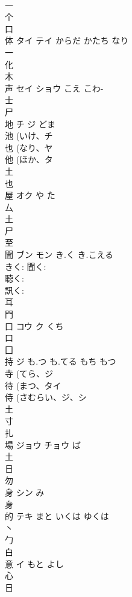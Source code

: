 \documentclass[8pt]{extreport}
\begin{document}
\begin{CJK}{UTF8}{min}
\\	一 
\\	个 
\\	口 
\\	体	タイ テイ	からだ かたち なり	
\\	一 
\\	化 
\\	木 
\\	声	セイ ショウ	こえ こわ-	
\\	士 
\\	尸 
\\	地	チ ジ	どま	
\\	池 (いけ、チ 
\\	也 (なり、ヤ 
\\	他 (ほか、タ 
\\	土 
\\	也 
\\	屋	オク	や た	
\\	厶 
\\	土 
\\	尸 
\\	至 
\\	聞	ブン モン	き.く き.こえる	
\\	きく: 聞く: 
\\	聴く: 
\\	訊く: 
\\	耳 
\\	門 
\\	口	コウ ク	くち	
\\	口 
\\	囗 
\\	持	ジ	も.つ も.てる もち もつ	
\\	寺 (てら、ジ 
\\	待 (まつ、タイ 
\\	侍 (さむらい、ジ、シ 
\\	土 
\\	寸 
\\	扎	
\\	場	ジョウ チョウ	ば	
\\	土 
\\	日 
\\	勿 
\\	身	シン	み	
\\	身 
\\	的	テキ	まと いくは ゆくは	
\\	丶 
\\	勹 
\\	白 
\\	意	イ	もと よし	
\\	心 
\\	日 

\end{CJK}
\end{document}
